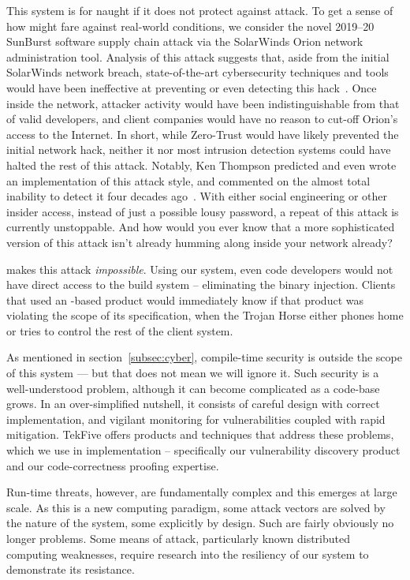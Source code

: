 This system is for naught if it does not protect against attack.
To get a sense of how \projectName might fare against real-world conditions, we consider the novel 2019--20 SunBurst software supply chain attack via the SolarWinds Orion network administration tool.
Analysis of this attack suggests that, aside from the initial SolarWinds network breach, state-of-the-art cybersecurity techniques and tools would have been ineffective at preventing or even detecting this hack~\cite{gao2022cybersecurity, fireeye2020sunburst}.
Once inside the network, attacker activity would have been indistinguishable from that of valid developers, and client companies would have no reason to cut-off Orion's access to the Internet.
In short, while Zero-Trust would have likely prevented the initial network hack, neither it nor most intrusion detection systems could have halted the rest of this attack.
Notably, Ken Thompson predicted and even wrote an implementation of this attack style, and commented on the almost total inability to detect it four decades ago~\cite{thompson1984trust}.
With either social engineering or other insider access, instead of just a possible lousy password, a repeat of this attack is currently unstoppable.
And how would you ever know that a more sophisticated version of this attack isn't already humming along inside your network already?

\projectName makes this attack \emph{impossible}.
Using our system, even code developers would not have direct access to the build system -- eliminating the binary injection.
Clients that used an \projectName-based product would immediately know if that product was violating the scope of its specification, when the Trojan Horse either phones home or tries to control the rest of the client system.

As mentioned in section~\ref{subsec:cyber}, compile-time security is outside the scope of this system --- but that does not mean we will ignore it.
Such security is a well-understood problem, although it can become complicated as a code-base grows.
In an over-simplified nutshell, it consists of careful design with correct implementation, and vigilant monitoring for vulnerabilities coupled with rapid mitigation.
TekFive offers products and techniques that address these problems, which we use in implementation -- specifically our \analysisName vulnerability discovery product and our code-correctness proofing expertise.

Run-time threats, however, are fundamentally complex and this emerges at large scale.
As this is a new computing paradigm, some attack vectors are solved by the nature of the system, some explicitly by design.
Such are fairly obviously no longer problems.
Some means of attack, particularly known distributed computing weaknesses, require research into the resiliency of our system to demonstrate its resistance.

